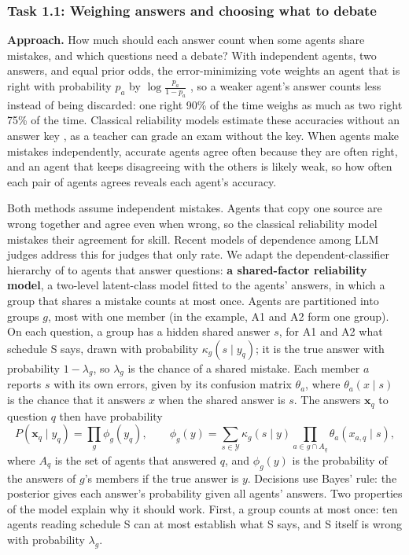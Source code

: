 \documentclass[12pt,letterpaper]{article}
\newcommand{\hd}[1]{\ifhmode\par\fi\addvspace{1pt}\noindent\textbf{#1}\hspace{0.35em}}
\begin{document}
\subsubsection{Task 1.1: Weighing answers and choosing what to debate}\label{sec:t11}
\hd{Approach.} How much should each answer count when some agents share mistakes, and which questions need a debate? With independent agents, two answers, and equal prior odds, the error-minimizing vote weights an agent that is right with probability $p_a$ by $\log\frac{p_a}{1-p_a}$ \citep{nitzan1982optimal,shapley1984optimizing}, so a weaker agent's answer counts less instead of being discarded: one right 90\% of the time weighs as much as two right 75\% of the time. Classical reliability models estimate these accuracies without an answer key \citep{dawid1979maximum}, as a teacher can grade an exam without the key. When agents make mistakes independently, accurate agents agree often because they are often right, and an agent that keeps disagreeing with the others is likely weak, so how often each pair of agents agrees reveals each agent's accuracy.

Both methods assume independent mistakes. Agents that copy one source are wrong together and agree even when wrong, so the classical reliability model mistakes their agreement for skill. Recent models of dependence among LLM judges \citep{balasubramanian2026ising,zhao2026care} address this for judges that only rate. We adapt the dependent-classifier hierarchy of \citet{jaffe2016dependent} to agents that answer questions: \textbf{a shared-factor reliability model}, a two-level latent-class model fitted to the agents' answers, in which a group that shares a mistake counts at most once. Agents are partitioned into groups $g$, most with one member (in the example, A1 and A2 form one group). On each question, a group has a hidden shared answer $s$, for A1 and A2 what schedule S says, drawn with probability $\kappa_g(s\mid y_q)$; it is the true answer with probability $1-\lambda_g$, so $\lambda_g$ is the chance of a shared mistake. Each member $a$ reports $s$ with its own errors, given by its confusion matrix $\theta_a$, where $\theta_a(x\mid s)$ is the chance that it answers $x$ when the shared answer is $s$. The answers $\mathbf{x}_q$ to question $q$ then have probability
\begin{equation}
P(\mathbf{x}_q\mid y_q)=\prod_{g}\phi_g(y_q),\qquad \phi_g(y)=\sum_{s\in\mathcal{Y}}\kappa_g(s\mid y)\prod_{a\in g\cap A_q}\theta_a(x_{a,q}\mid s),
\label{eq:sharedfactor}
\end{equation}
where $A_q$ is the set of agents that answered $q$, and $\phi_g(y)$ is the probability of the answers of $g$'s members if the true answer is $y$. Decisions use Bayes' rule: the posterior gives each answer's probability given all agents' answers. Two properties of the model explain why it should work. First, a group counts at most once: ten agents reading schedule S can at most establish what S says, and S itself is wrong with probability $\lambda_g$.
\end{document}
